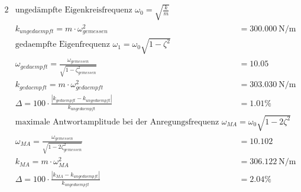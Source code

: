 \begin{solution}
    \begin{alignat*}{2}
        &\text{ungedämpfte Eigenkreisfrequenz  } \omega_0 = \sqrt{\frac{k}{m}} \\
        &k_{ungedaempft} = m \cdot \omega_{gemessen}^2 &&= \SI{300.000}{\newton \per \meter} \\
        &\text{gedaempfte Eigenfrequenz  } \omega_1 = \omega_0 \sqrt{1-\zeta^2} \\
        &\omega_{gedaempft} = \frac{\omega_{gemessen}}{\sqrt{1-\zeta_{gemessen}^2}} &&= 10.05\\
        &k_{gedaempft} = m \cdot \omega_{gedaempft}^2 &&= \SI{303.030}{\newton \per \meter}\\
        &\Delta = 100 \cdot \frac{|k_{gedaempft} - k_{ungedaempft}|}{k_{ungedaempft}} &&= 1.01 \%\\
        &\text{maximale Antwortamplitude bei der Anregungsfrequenz  } \omega_{MA} = \omega_0 \sqrt{1-2 \zeta^2} \\
        &\omega_{MA} = \frac{\omega_{gemessen}}{\sqrt{1-2\zeta_{gemessen}^2}} &&= 10.102\\
        &k_{MA} = m \cdot \omega_{MA}^2 &&= \SI{306.122}{\newton \per \meter}\\
        &\Delta = 100 \cdot \frac{|k_{MA} - k_{ungedaempft}|}{k_{ungedaempft}} &&= 2.04 \% \\ 
    \end{alignat*}
\end{solution}


